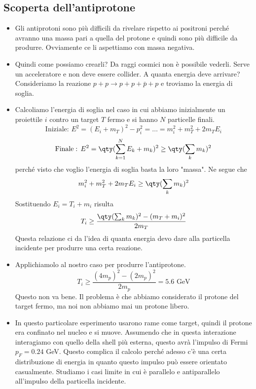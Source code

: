 \subsection{Scoperta dell'antiprotone}
\begin{itemize}
    \item Gli antiprotoni sono più difficili da rivelare rispetto ai positroni perché avranno una massa pari a quella del protone e quindi sono più difficile da produrre. Ovviamente ce li aspettiamo con massa negativa.
    \item Quindi come possiamo crearli? Da raggi cosmici non è possibile vederli. Serve un acceleratore e non deve essere collider. A quanta energia deve arrivare? Consideriamo la reazione $p+p\to p+p+\bar p+p$ e troviamo la energia di soglia.
    \item Calcoliamo l'energia di soglia nel caso in cui abbiamo inizialmente un proiettile $i$ contro un target $T$ fermo e si hanno $N$ particelle finali.
    \begin{equation*}
    \text{Iniziale}:\,E^2=(E_i+m_T)^2-p_i^2=\dots=m_i^2+m_T^2+2m_TE_i
    \end{equation*}
    \begin{equation*}
    \text{Finale}:\,E^2=\qty(\sum_{k=1}^N E_k+m_k)^2\geq\qty(\sum_km_k)^2
    \end{equation*}
    perché visto che voglio l'energia di soglia basta la loro "massa". Ne segue che 
    \begin{equation*}
    m_i^2+m_T^2+2m_TE_i\geq\qty(\sum_km_k)^2
    \end{equation*}
    Sostituendo $E_i=T_i+m_i$ risulta
    \begin{equation*}
    T_i\geq\frac{\qty(\sum_km_k)^2-(m_T+m_i)^2 } {2m_T}
    \end{equation*}
    Questa relazione ci da l'idea di quanta energia devo dare alla particella incidente per produrre una certa reazione.
    \item Applichiamolo al nostro caso per produrre l'antiprotone.
    \begin{equation*}
    T_i\geq\frac{(4m_p)^2-(2m_p)^2}{2m_p}=5.6\text{ GeV}
    \end{equation*}
    Questo non va bene. Il problema è che abbiamo considerato il protone del target fermo, ma noi non abbiamo mai un protone libero.
    \item In questo particolare esperimento usarono rame come target, quindi il protone era confinato nel nucleo e si muove. Assumendo che in questa interazione interagiamo con quello della shell più esterna, questo avrà l'impulso di Fermi $p_F=0.24$ GeV. Questo complica il calcolo perché adesso c'è una certa distribuzione di energia in quanto questo impulso può essere orientato casualmente. Studiamo i casi limite in cui è parallelo e antiparallelo all'impulso della particella incidente.

\end{itemize}
